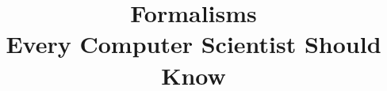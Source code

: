 \usepackage[utf8]{inputenc}

\title{Formalisms\\
Every Computer Scientist Should Know}
\date{}





\usepackage{fix-cm}  
\usepackage{tikz}    
\usepackage{amsmath} 
\usepackage{amssymb,amsfonts,amsthm,mathtools}
\usepackage[shortlabels]{enumitem}

\usepackage{graphicx}
\usepackage{makeidx}
\makeindex 
\usepackage{pbox}
\usepackage{stmaryrd}
\usepackage{hyperref}
\usepackage{cleveref}
\usepackage{mathpartir}
\usepackage{tikz}
\usepackage{algorithm}
\usepackage{algpseudocode}
\usepackage{bussproofs}

\usetikzlibrary {petri}
\usetikzlibrary{arrows.meta}
\usetikzlibrary{shapes,snakes}
\usetikzlibrary{fit}


\theoremstyle{plain}
\newtheorem{theorem}{Theorem}[section]
\newtheorem{lemma}[theorem]{Lemma}
\newtheorem{corollary}[theorem]{Corollary}

\theoremstyle{definition}
\newtheorem{definition}{Definition}[section]
\newtheorem{exercise}{Exercise}[section]
\newtheorem{example}{Example}[section]

\theoremstyle{remark}
\newtheorem{remark}{Remark}[section]
\newtheorem{metatheorem}{Metatheorem}[section]
\newtheorem{axiom}{Axiom}[section]

